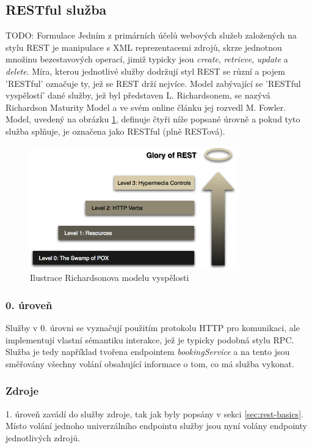 \documentclass[czech,DP]{thesiskiv}
\begin{document}
\subsection{RESTful služba}

TODO: Formulace
Jedním z primárních účelů webových služeb založených na stylu REST je manipulace s XML reprezentacemi zdrojů, skrze jednotnou množinu bezestavových operací, jimiž typicky jsou  \textit{create}, \textit{retrieve}, \textit{update} a \textit{delete}\cite{w3cWsArch}. Míra, kterou jednotlivé služby dodržují styl REST se různí a pojem 'RESTful' označuje ty, jež se REST drží nejvíce. Model zabývající se 'RESTful vyspělostí' dané služby, jež byl představen L. Richardsonem, se nazývá Richardson Maturity Model a ve svém online článku \cite{restfulMaturity} jej rozvedl M. Fowler. Model, uvedený na obrázku \ref{fig:rmm}, definuje čtyři níže popsané úrovně a pokud tyto služba splňuje, je označena jako RESTful (plně RESTová).

\begin{figure}[h]
	\centering
	\includegraphics[width=9cm]{richardsonMaturityModel}
	\caption{Ilustrace Richardsonova modelu vyspělosti}
	\label{fig:rmm}
\end{figure}


\subsubsection{0. úroveň}
Služby v 0. úrovni se vyznačují použitím protokolu HTTP pro komunikaci, ale implementují vlastní sémantiku interakce, jež je typicky podobná stylu RPC. Služba je tedy například tvořena endpointem \textit{bookingService} a na tento jsou směřovány všechny volání obsahující informace o tom, co má služba vykonat. 

\subsubsection{Zdroje}
1. úroveň zavádí do služby zdroje, tak jak byly popsány v sekci \ref{sec:rest-basics}. Místo volání jednoho univerzálního endpointu služby jsou nyní volány endpointy jednotlivých zdrojů.
\end{document}
